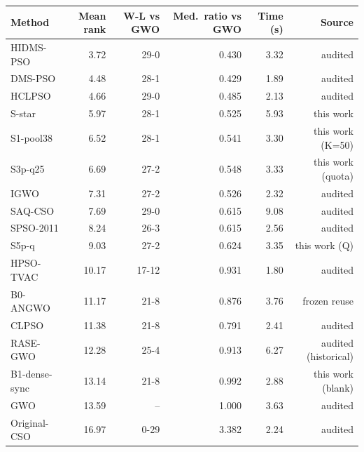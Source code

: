 \begin{tabular}{lrrrrr}
\toprule
Method & Mean rank & W-L vs GWO & Med.\ ratio vs GWO & Time (s) & Source\\
\midrule
HIDMS-PSO & 3.72 & 29-0 & 0.430 & 3.32 & audited \\
DMS-PSO & 4.48 & 28-1 & 0.429 & 1.89 & audited \\
HCLPSO & 4.66 & 29-0 & 0.485 & 2.13 & audited \\
S-star & 5.97 & 28-1 & 0.525 & 5.93 & this work \\
S1-pool38 & 6.52 & 28-1 & 0.541 & 3.30 & this work (K=50) \\
S3p-q25 & 6.69 & 27-2 & 0.548 & 3.33 & this work (quota) \\
IGWO & 7.31 & 27-2 & 0.526 & 2.32 & audited \\
SAQ-CSO & 7.69 & 29-0 & 0.615 & 9.08 & audited \\
SPSO-2011 & 8.24 & 26-3 & 0.615 & 2.56 & audited \\
S5p-q & 9.03 & 27-2 & 0.624 & 3.35 & this work (Q) \\
HPSO-TVAC & 10.17 & 17-12 & 0.931 & 1.80 & audited \\
B0-ANGWO & 11.17 & 21-8 & 0.876 & 3.76 & frozen reuse \\
CLPSO & 11.38 & 21-8 & 0.791 & 2.41 & audited \\
RASE-GWO & 12.28 & 25-4 & 0.913 & 6.27 & audited (historical) \\
B1-dense-sync & 13.14 & 21-8 & 0.992 & 2.88 & this work (blank) \\
GWO & 13.59 & -- & 1.000 & 3.63 & audited \\
Original-CSO & 16.97 & 0-29 & 3.382 & 2.24 & audited \\
\bottomrule
\end{tabular}